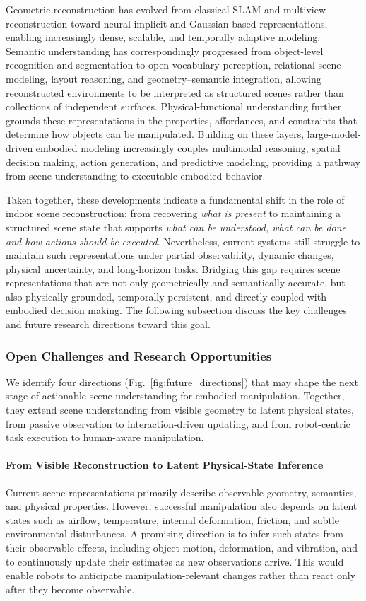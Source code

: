 \documentclass{SCIS2026}
\begin{document}
Geometric reconstruction has evolved from classical SLAM and multiview reconstruction toward neural implicit and Gaussian-based representations, enabling increasingly dense, scalable, and temporally adaptive modeling. Semantic understanding has correspondingly progressed from object-level recognition and segmentation to open-vocabulary perception, relational scene modeling, layout reasoning, and geometry--semantic integration, allowing reconstructed environments to be interpreted as structured scenes rather than collections of independent surfaces. Physical-functional understanding further grounds these representations in the properties, affordances, and constraints that determine how objects can be manipulated. Building on these layers, large-model-driven embodied modeling increasingly couples multimodal reasoning, spatial decision making, action generation, and predictive modeling, providing a pathway from scene understanding to executable embodied behavior.

Taken together, these developments indicate a fundamental shift in the role of indoor scene reconstruction: from recovering \emph{what is present} to maintaining a structured scene state that supports \emph{what can be understood, what can be done, and how actions should be executed}. Nevertheless, current systems still struggle to maintain such representations under partial observability, dynamic changes, physical uncertainty, and long-horizon tasks. Bridging this gap requires scene representations that are not only geometrically and semantically accurate, but also physically grounded, temporally persistent, and directly coupled with embodied decision making. The following subsection discuss the key challenges and future research directions toward this goal.

\subsubsection{Open Challenges and Research Opportunities}

We identify four directions (Fig.~\ref{fig:future_directions}) that may shape the next stage of actionable scene understanding for embodied manipulation. Together, they extend scene understanding from visible geometry to latent physical states, from passive observation to interaction-driven updating, and from robot-centric task execution to human-aware manipulation.

\paragraph{From Visible Reconstruction to Latent Physical-State Inference}
Current scene representations primarily describe observable geometry, semantics, and physical properties. However, successful manipulation also depends on latent states such as airflow, temperature, internal deformation, friction, and subtle environmental disturbances. A promising direction is to infer such states from their observable effects, including object motion, deformation, and vibration, and to continuously update their estimates as new observations arrive. This would enable robots to anticipate manipulation-relevant changes rather than react only after they become observable.
\end{document}
